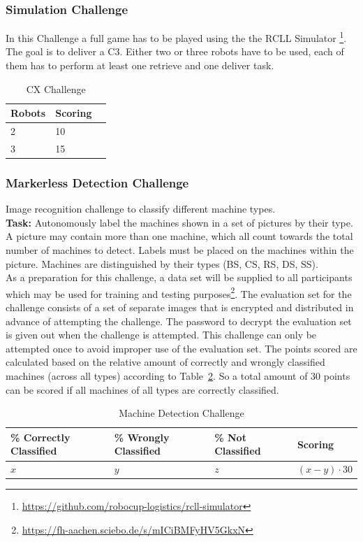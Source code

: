 \documentclass[12pt,twoside]{article}
\newcommand{\reftab}[1]{Table~\ref{#1}}
\begin{document}
\subsubsection{Simulation Challenge}\label{sec:challenge-simulation}
In this Challenge a full game has to be played using the the RCLL Simulator
\footnote{\url{https://github.com/robocup-logistics/rcll-simulator}}.
The goal is to deliver a C3. Either two or three robots have to be used,
each of them has to perform at least one retrieve and one deliver task.
\begin{table}[!htb]
  \centering
  \begin{tabular}{l|l|l}
   Robots  & Scoring \\\hline
   2 & 10 \\
   3 & 15 \\
  \end{tabular}
  \caption{CX Challenge}
  \label{tab:challenge-cx}
 \end{table}

\subsubsection{Markerless Detection Challenge}\label{sec:challenge-markerless}
Image recognition challenge to classify different machine types.\\
\textbf{Task:} Autonomously label the machines shown in a set of pictures
by their type.
A picture may contain more than one machine, which all count towards the
total number of machines to detect. Labels must be placed on the machines
within the picture. Machines are distinguished by their types
(BS, CS, RS, \ac{DS}, \ac{SS}).\\
As a preparation for this challenge, a data set will be supplied to
all participants which may be used for training and testing
purposes\footnote{\url{https://fh-aachen.sciebo.de/s/mICiBMFyHV5GkxN}}.
The evaluation set for the challenge consists of a set of separate images that
is encrypted and distributed in advance of attempting the challenge.
The password to decrypt the evaluation set is given out when the challenge
is attempted.
This challenge can only be attempted once to avoid improper use of the
evaluation set.
The points scored are calculated based on the relative amount of correctly
and wrongly classified machines (across all types) according to
\reftab{tab:challenge-markerless}. So a total amount of 30 points can be scored
if all machines of all types are correctly classified.
\begin{table}[!htb]
 \centering
 \begin{tabularx}{\linewidth}{l|l|l|l}
  \% Correctly Classified & \% Wrongly Classified & \% Not Classified
  & Scoring \\\hline
  $x$ & $y$ & $z$ & $(x-y)\cdot30$
 \end{tabularx}
 \caption{Machine Detection Challenge}
 \label{tab:challenge-markerless}
\end{table}
\end{document}
